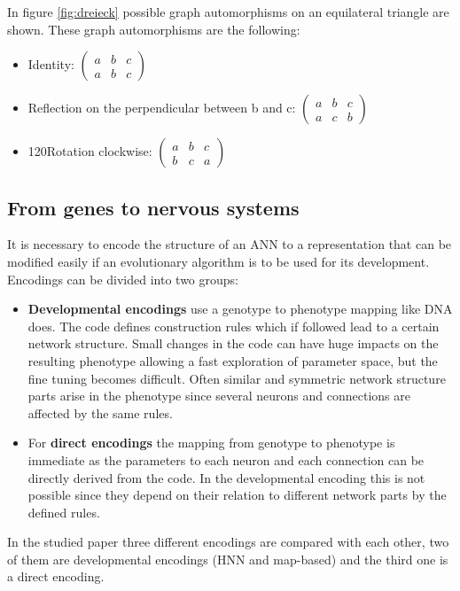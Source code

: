 \documentclass[12pt,twoside]{article}
\theoremstyle{plain}
\theoremstyle{definition}
\theoremstyle{remark}
\begin{document}
In figure \ref{fig:dreieck} possible graph automorphisms on an equilateral triangle are shown. These graph automorphisms are the following:
\begin{itemize}
	\item Identity:
	$
	\begin{pmatrix}
	a & b & c \\
	a & b & c
	\end{pmatrix}
	$
	\item Reflection on the perpendicular between b and c:
	$
	\begin{pmatrix}
	a & b & c \\
	a & c & b
	\end{pmatrix}
	$
	\item 120\degree Rotation clockwise:
	$
	\begin{pmatrix}
	a & b & c \\
	b & c & a
	\end{pmatrix}
	$
\end{itemize} 

\subsection{From genes to nervous systems}
\label{genes_nervous}
It is necessary to encode the structure of an ANN to a representation that can be modified easily if an evolutionary algorithm is to be used for its development.
Encodings can be divided into two groups:
\begin{itemize}
	\item \textbf{Developmental encodings} use a genotype to phenotype mapping like DNA does. The code defines construction rules which if followed lead to a certain network structure. Small changes in the code can have huge impacts on the resulting phenotype allowing a fast exploration of parameter space, but the fine tuning becomes difficult.
	Often similar and symmetric network structure parts arise in the phenotype since several neurons and connections are affected by the same rules.
	\item For \textbf{direct encodings} the mapping from genotype to phenotype is immediate as the parameters to each neuron and each connection can be directly derived from the code. In the developmental encoding this is not possible since they depend on their relation to different network parts by the defined rules.
\end{itemize}
In the studied paper three different encodings are compared with each other, two of them are developmental encodings (HNN and map-based) and the third one is a direct encoding.
\end{document}
